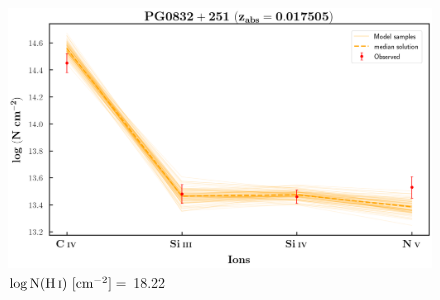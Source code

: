   \begin{figure}[!h]
      \centering
      \includegraphics[width=0.85\linewidth]{Ionisation-Modelling-Plots/pg0832-z=0.017505-compIII_logZ=-1.png}
      \caption{$\log \text{N}(\ion{H}{i}) \ [\text{cm}^{-2}]=$ 18.22}
  \end{figure}
  
  
















 














